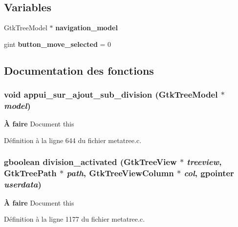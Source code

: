 \subsection*{Variables}
\begin{DoxyCompactItemize}
\item 
GtkTreeModel $\ast$ {\bf navigation\_\-model}
\item 
gint {\bf button\_\-move\_\-selected} = 0
\end{DoxyCompactItemize}


\subsection{Documentation des fonctions}
\subsubsection[{appui\_\-sur\_\-ajout\_\-sub\_\-division}]{\setlength{\rightskip}{0pt plus 5cm}void appui\_\-sur\_\-ajout\_\-sub\_\-division (GtkTreeModel $\ast$ {\em model})}\label{metatree_8c_adc51b18c5d2db6840fe918ca84067139}
\begin{Desc}
\item[{\bf À faire}]Document this\end{Desc}


Définition à la ligne 644 du fichier metatree.c.

\subsubsection[{division\_\-activated}]{\setlength{\rightskip}{0pt plus 5cm}gboolean division\_\-activated (GtkTreeView $\ast$ {\em treeview}, \/  GtkTreePath $\ast$ {\em path}, \/  GtkTreeViewColumn $\ast$ {\em col}, \/  gpointer {\em userdata})}\label{metatree_8c_a2016821cfa93c13034c3934f60b39473}
\begin{Desc}
\item[{\bf À faire}]Document this\end{Desc}


Définition à la ligne 1177 du fichier metatree.c.

